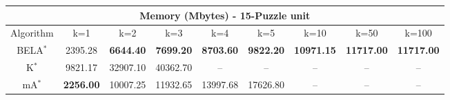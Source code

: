 \begin{tabular}{c|cccccccc}\toprule
\multicolumn{9}{c}{Memory (Mbytes) - 15-Puzzle unit}\\ \midrule
Algorithm & k=1 & k=2 & k=3 & k=4 & k=5 & k=10 & k=50 & k=100 \\ \midrule
BELA$^*$ & 2395.28 & \textbf{6644.40} & \textbf{7699.20} & \textbf{8703.60} & \textbf{9822.20} & \textbf{10971.15} & \textbf{11717.00} & \textbf{11717.00} \\
K$^*$ & 9821.17 & 32907.10 & 40362.70 & -- & -- & -- & -- & -- \\
mA$^*$ & \textbf{2256.00} & 10007.25 & 11932.65 & 13997.68 & 17626.80 & -- & -- & -- \\ \bottomrule 
\end{tabular}
